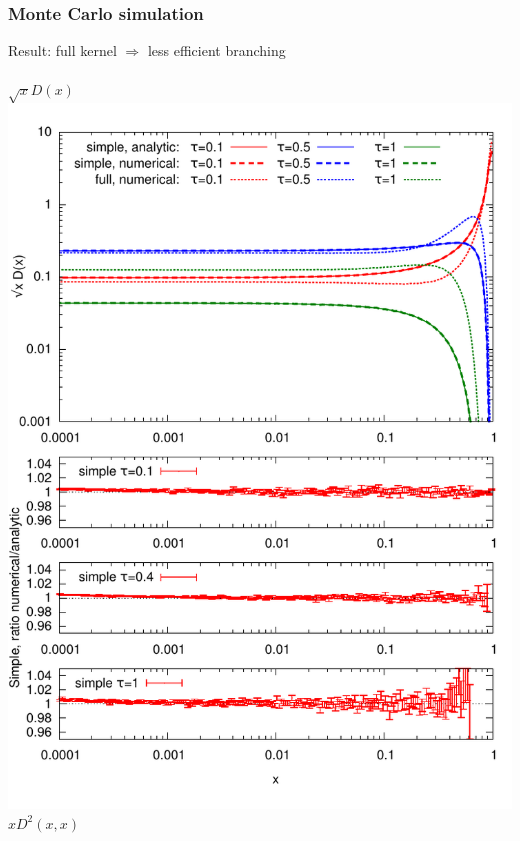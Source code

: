 \documentclass[pstricks,mathserif]{beamer}
\begin{document}
\begin{frame}
\frametitle{Monte Carlo simulation}

Result: full kernel $\Rightarrow$ less efficient branching\\
~\\



\centering
\small $\sqrt{x} D(x)$
\includegraphics[width=1\linewidth]{times.pdf}
\endminipage\hfill
{}
\centering
\small $x D^2(x,x)$

\end{frame}
\end{document}
